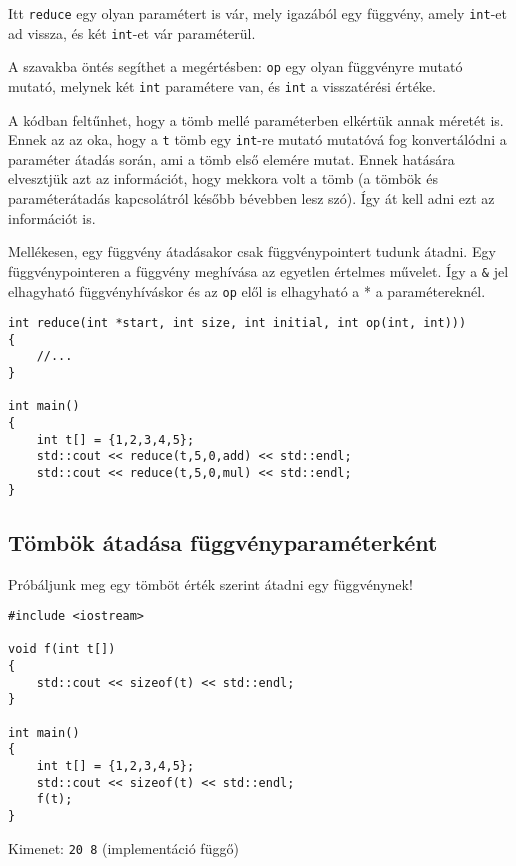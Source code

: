\documentclass[a4paper,11.5pt,table]{article}
\begin{document}
	Itt \texttt{reduce} egy olyan paramétert is vár, mely igazából egy függvény, amely \texttt{int}-et ad vissza, és két \texttt{int}-et vár paraméterül.
	\begin{note}
		A szavakba öntés segíthet a megértésben: \texttt{op} egy olyan függvényre mutató mutató, melynek két \texttt{int} paramétere van, és \texttt{int} a visszatérési értéke.
	\end{note}
	
	A kódban feltűnhet, hogy a tömb mellé paraméterben elkértük annak méretét is. Ennek az az oka, hogy a \texttt{t} tömb egy \texttt{int}-re mutató mutatóvá fog konvertálódni a paraméter átadás során, ami a tömb első elemére mutat. Ennek hatására elvesztjük azt az információt, hogy mekkora volt a tömb (a tömbök és paraméterátadás kapcsolátról később bévebben lesz szó). Így át kell adni ezt az információt is. 
	
	Mellékesen, egy függvény átadásakor csak függvénypointert tudunk átadni. Egy függvénypointeren a függvény meghívása az egyetlen értelmes művelet. Így a \texttt{\&} jel elhagyható függvényhíváskor és az \texttt{op} elől is elhagyható a * a paramétereknél.
	\begin{lstlisting}
int reduce(int *start, int size, int initial, int op(int, int)))
{
	//...
}

int main()
{
	int t[] = {1,2,3,4,5};
	std::cout << reduce(t,5,0,add) << std::endl;
	std::cout << reduce(t,5,0,mul) << std::endl;
}
	\end{lstlisting}
	\subsection{Tömbök átadása függvényparaméterként}
	Próbáljunk meg egy tömböt érték szerint átadni egy függvénynek!
	\begin{lstlisting}
#include <iostream>

void f(int t[])
{
	std::cout << sizeof(t) << std::endl;
}

int main()
{
	int t[] = {1,2,3,4,5};
	std::cout << sizeof(t) << std::endl;
	f(t);
}
	\end{lstlisting}
	Kimenet: \texttt{20 8} (implementáció függő)
	
\end{document}
